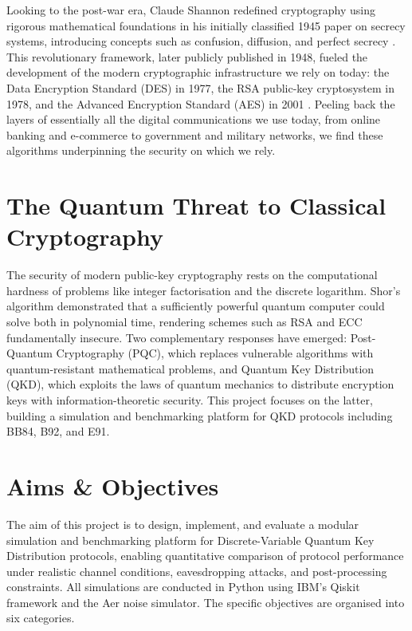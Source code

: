 \documentclass[10pt, a4paper]{report}
\begin{document}
Looking to the post-war era, Claude Shannon redefined cryptography using rigorous mathematical foundations in his initially classified 1945 paper on secrecy systems, introducing concepts such as confusion, diffusion, and perfect secrecy \cite{Shannon1945}. This revolutionary framework, later publicly published in 1948, fueled the development of the modern cryptographic infrastructure we rely on today: the Data Encryption Standard (DES) in 1977, the RSA public-key cryptosystem in 1978, and the Advanced Encryption Standard (AES) in 2001 \cite{Shannon1948, DiffieHellman1976, RSA1978}. Peeling back the layers of essentially all the digital communications we use today, from online banking and e-commerce to government and military networks, we find these algorithms underpinning the security on which we rely. 

\section{The Quantum Threat to Classical Cryptography}

The security of modern public-key cryptography rests on the computational hardness of problems like integer factorisation and the discrete logarithm. Shor's algorithm \cite{Shor1997} demonstrated that a sufficiently powerful quantum computer could solve both in polynomial time, rendering schemes such as RSA and ECC fundamentally insecure. Two complementary responses have emerged: Post-Quantum Cryptography (PQC), which replaces vulnerable algorithms with quantum-resistant mathematical problems, and Quantum Key Distribution (QKD), which exploits the laws of quantum mechanics to distribute encryption keys with information-theoretic security. This project focuses on the latter, building a simulation and benchmarking platform for QKD protocols including BB84, B92, and E91.


\newpage
\section{Aims \& Objectives}

The aim of this project is to design, implement, and evaluate a modular simulation and benchmarking platform for Discrete-Variable Quantum Key Distribution protocols, enabling quantitative comparison of protocol performance under realistic channel conditions, eavesdropping attacks, and post-processing constraints. All simulations are conducted in Python using IBM's Qiskit framework and the Aer noise simulator. The specific objectives are organised into six categories.
\end{document}

